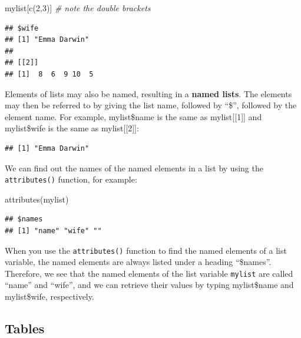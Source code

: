 \documentclass[
]{book}
\newenvironment{Shaded}{\begin{snugshade}}{\end{snugshade}}
\newcommand{\CommentTok}[1]{\textcolor[rgb]{0.56,0.35,0.01}{\textit{#1}}}
\newcommand{\DecValTok}[1]{\textcolor[rgb]{0.00,0.00,0.81}{#1}}
\newcommand{\FunctionTok}[1]{\textcolor[rgb]{0.00,0.00,0.00}{#1}}
\newcommand{\NormalTok}[1]{#1}
\newcommand{\SpecialCharTok}[1]{\textcolor[rgb]{0.00,0.00,0.00}{#1}}
\begin{document}
\begin{Shaded}
\begin{Highlighting}[]
\NormalTok{mylist[}\FunctionTok{c}\NormalTok{(}\DecValTok{2}\NormalTok{,}\DecValTok{3}\NormalTok{)] }\CommentTok{\# note the double brackets}
\end{Highlighting}
\end{Shaded}

\begin{verbatim}
## $wife
## [1] "Emma Darwin"
## 
## [[2]]
## [1]  8  6  9 10  5
\end{verbatim}

Elements of lists may also be named, resulting in a \textbf{named lists}. The elements may then be referred to by giving the list name, followed by ``\$'', followed by the element name. For example, mylist\$name is the same as mylist{[}{[}1{]}{]} and mylist\$wife is the same as mylist{[}{[}2{]}{]}:

\begin{Shaded}
\end{Shaded}

\begin{verbatim}
## [1] "Emma Darwin"
\end{verbatim}

We can find out the names of the named elements in a list by using the \texttt{attributes()} function, for example:

\begin{Shaded}
\begin{Highlighting}[]
\FunctionTok{attributes}\NormalTok{(mylist)}
\end{Highlighting}
\end{Shaded}

\begin{verbatim}
## $names
## [1] "name" "wife" ""
\end{verbatim}

When you use the \texttt{attributes()} function to find the named elements of a list variable, the named elements are always listed under a heading ``\$names''. Therefore, we see that the named elements of the list variable \texttt{mylist} are called ``name'' and ``wife'', and we can retrieve their values by typing mylist\$name and mylist\$wife, respectively.

\hypertarget{tables}{%
\subsection{Tables}\label{tables}}
\end{document}
